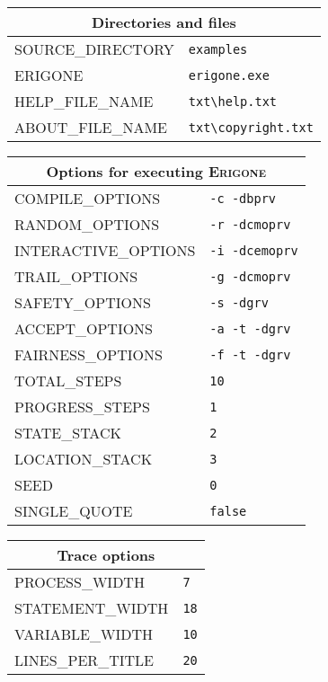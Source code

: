 \documentclass[11pt]{article}
\newcommand{\eri}{\textsc{Erigone}}
\begin{document}
\begin{center}

\begin{tabular}{|p{}|p{}|}
\hline
\multicolumn{2}{|c|}{Directories and files}\\ \hline
\textsc{\ttfamily SOURCE\_DIRECTORY} & \verb+examples+ \\
\textsc{\ttfamily ERIGONE} &\verb+erigone.exe+ \\
\textsc{\ttfamily HELP\_FILE\_NAME} &\verb+txt\help.txt+\\
\textsc{\ttfamily ABOUT\_FILE\_NAME} &\verb+txt\copyright.txt+\\
\hline
\end{tabular}

\bigskip

\begin{tabular}{|p{}|p{}|}
\hline
\multicolumn{2}{|c|}{Options for executing \eri{}}\\ \hline
\textsc{\ttfamily COMPILE\_OPTIONS} &\verb+-c -dbprv+\\
\textsc{\ttfamily RANDOM\_OPTIONS} &\verb+-r -dcmoprv+\\
\textsc{\ttfamily INTERACTIVE\_OPTIONS} &\verb+-i -dcemoprv+\\
\textsc{\ttfamily TRAIL\_OPTIONS} &\verb+-g -dcmoprv+\\
\textsc{\ttfamily SAFETY\_OPTIONS} &\verb+-s -dgrv+\\
\textsc{\ttfamily ACCEPT\_OPTIONS} &\verb+-a -t -dgrv+\\
\textsc{\ttfamily FAIRNESS\_OPTIONS} &\verb+-f -t -dgrv+\\
\hline\hline
\textsc{\ttfamily TOTAL\_STEPS} & \verb+10+\\
\textsc{\ttfamily PROGRESS\_STEPS} & \verb+1+\\
\textsc{\ttfamily STATE\_STACK} & \verb+2+\\
\textsc{\ttfamily LOCATION\_STACK} & \verb+3+\\
\textsc{\ttfamily SEED} & \verb+0+\\
\textsc{\ttfamily SINGLE\_QUOTE} & \verb+false+\\\hline
\end{tabular}

\bigskip

\begin{tabular}{|p{}|p{}|}
\hline
\multicolumn{2}{|c|}{Trace options}\\ \hline
\textsc{\ttfamily PROCESS\_WIDTH} & \verb+7+\\
\textsc{\ttfamily STATEMENT\_WIDTH} & \verb+18+\\
\textsc{\ttfamily VARIABLE\_WIDTH} &\verb+10+\\
\textsc{\ttfamily LINES\_PER\_TITLE} &\verb+20+\\
\hline
\end{tabular}


\end{center}
\end{document}
